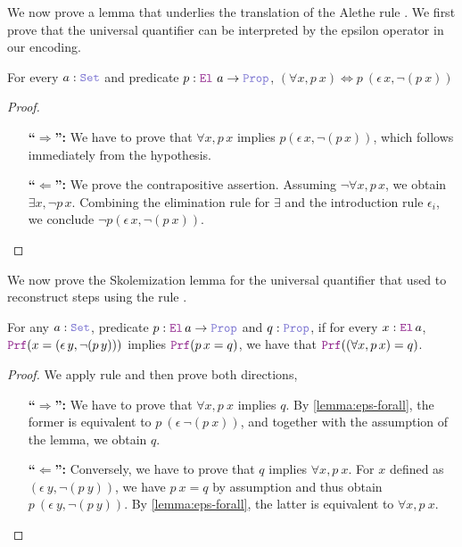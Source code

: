 We now prove a lemma that underlies the translation of the Alethe rule .
We first prove that the universal quantifier can be interpreted by the epsilon operator in our encoding.

\smallskip

\begin{lemma}\label{lemma:eps-forall}
For every $a : \set$ and predicate $p: \el~a \ra \prop$, $(\forall x, p~x) \Leftrightarrow p~(\epsilon\,x, \neg (p~x))$
\end{lemma}
\begin{proof}
\begin{itemize}
\item[\textbf{``$\Rightarrow$'':}]  We have to prove that $\forall x, p\,x$ implies $p(\epsilon\,x, \neg (p\,x))$, which follows immediately from the hypothesis.
\item[\textbf{``$\Leftarrow$'':}]  We prove the contrapositive assertion. Assuming $\neg \forall x, p\,x$, we obtain $\exists x, \neg p\,x$. Combining the elimination rule for $\exists$ and the introduction rule $\epsilon_i$, we conclude $\neg p(\epsilon\,x, \neg (p~x))$.
\end{itemize}
\end{proof}

We now prove the Skolemization lemma for the universal quantifier that used to reconstruct steps using the rule .

\smallskip

\begin{lemma}\label{lem:sko-forall}
For any $a : \set$, predicate $p : \el{}\,a \ra \prop$ and $q : \prop$, if for every $x: \el{}\,a$, $\prf (x = (\epsilon \, y, \neg (p\,y)))$ implies $\prf (p\,x = q)$,  we have that $\prf ((\forall x, p\,x) = q)$.
\end{lemma}
\begin{proof} We apply rule  and then prove both directions,
\begin{itemize}
\item[\textbf{``$\Rightarrow$'':}]  We have to prove that $\forall x, p~x$ implies $q$. By \cref{lemma:eps-forall}, the former is equivalent to $p~(\epsilon~\neg (p~x))$, and together with the assumption of the lemma, we obtain $q$.
\item[\textbf{``$\Leftarrow$'':}]  Conversely, we have to prove that $q$ implies $\forall x, p~x$. For $x$ defined as $(\epsilon~y, \neg (p~y))$, we have $p~x = q$ by assumption and thus obtain $p~(\epsilon~y, \neg (p~y))$. By \cref{lemma:eps-forall}, the latter is equivalent to $\forall x, p~x$.
\end{itemize}
\end{proof}

